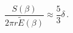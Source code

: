 \begin{equation}
\frac{S\left(\beta \right)}{2\pi r\widetilde{E}\left(\beta \right)}\approx 
\frac{5}{3}\delta \, .\end{equation}

